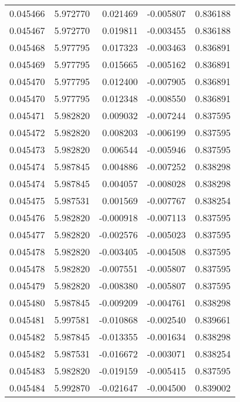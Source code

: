 \begin{tabular}{lrrrr}
0.045466    &  5.972770 &  0.021469 & -0.005807 &             0.836188 \\
0.045467    &  5.972770 &  0.019811 & -0.003455 &             0.836188 \\
0.045468    &  5.977795 &  0.017323 & -0.003463 &             0.836891 \\
0.045469    &  5.977795 &  0.015665 & -0.005162 &             0.836891 \\
0.045470    &  5.977795 &  0.012400 & -0.007905 &             0.836891 \\
0.045470    &  5.977795 &  0.012348 & -0.008550 &             0.836891 \\
0.045471    &  5.982820 &  0.009032 & -0.007244 &             0.837595 \\
0.045472    &  5.982820 &  0.008203 & -0.006199 &             0.837595 \\
0.045473    &  5.982820 &  0.006544 & -0.005946 &             0.837595 \\
0.045474    &  5.987845 &  0.004886 & -0.007252 &             0.838298 \\
0.045474    &  5.987845 &  0.004057 & -0.008028 &             0.838298 \\
0.045475    &  5.987531 &  0.001569 & -0.007767 &             0.838254 \\
0.045476    &  5.982820 & -0.000918 & -0.007113 &             0.837595 \\
0.045477    &  5.982820 & -0.002576 & -0.005023 &             0.837595 \\
0.045478    &  5.982820 & -0.003405 & -0.004508 &             0.837595 \\
0.045478    &  5.982820 & -0.007551 & -0.005807 &             0.837595 \\
0.045479    &  5.982820 & -0.008380 & -0.005807 &             0.837595 \\
0.045480    &  5.987845 & -0.009209 & -0.004761 &             0.838298 \\
0.045481    &  5.997581 & -0.010868 & -0.002540 &             0.839661 \\
0.045482    &  5.987845 & -0.013355 & -0.001634 &             0.838298 \\
0.045482    &  5.987531 & -0.016672 & -0.003071 &             0.838254 \\
0.045483    &  5.982820 & -0.019159 & -0.005415 &             0.837595 \\
0.045484    &  5.992870 & -0.021647 & -0.004500 &             0.839002 \\

\end{tabular}
